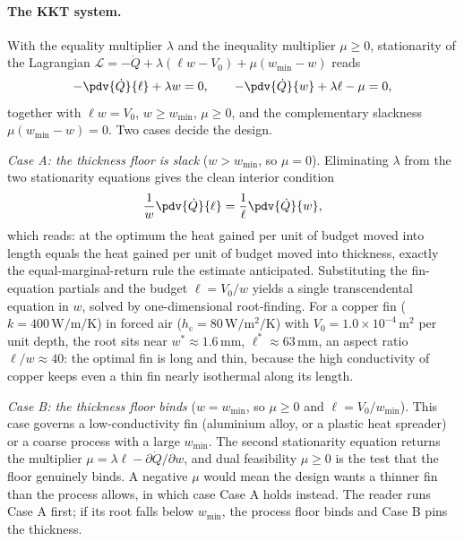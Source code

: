 \paragraph{The KKT system.} With the equality multiplier $\lambda$ and
the inequality multiplier $\mu \geq 0$, stationarity of the Lagrangian
$\mathcal{L} = -\dot{Q} + \lambda(\ell w - V_{0}) + \mu(w_{\min} - w)$
reads
\[
-\pdv{\dot{Q}}{\ell} + \lambda w = 0, \qquad
-\pdv{\dot{Q}}{w} + \lambda \ell - \mu = 0,
\]
together with $\ell w = V_{0}$, $w \geq w_{\min}$, $\mu \geq 0$, and the
complementary slackness $\mu(w_{\min} - w) = 0$. Two cases decide the
design.

\textit{Case A: the thickness floor is slack} ($w > w_{\min}$, so
$\mu = 0$). Eliminating $\lambda$ from the two stationarity equations
gives the clean interior condition
\[
\frac{1}{w}\pdv{\dot{Q}}{\ell} = \frac{1}{\ell}\pdv{\dot{Q}}{w},
\]
which reads: at the optimum the heat gained per unit of budget moved
into length equals the heat gained per unit of budget moved into
thickness, exactly the equal-marginal-return rule the estimate
anticipated. Substituting the fin-equation partials and the budget
$\ell = V_{0}/w$ yields a single transcendental equation in $w$, solved
by one-dimensional root-finding. For a copper fin
($k = 400\,\si{\watt\per\meter\per\kelvin}$) in forced air
($h_{\mathrm{c}} = 80\,\si{\watt\per\meter\squared\per\kelvin}$) with
$V_{0} = 1.0\times 10^{-4}\,\si{\meter\squared}$ per unit depth, the
root sits near $w^{*} \approx 1.6\,\si{\milli\meter}$,
$\ell^{*} \approx 63\,\si{\milli\meter}$, an aspect ratio
$\ell/w \approx 40$: the optimal fin is long and thin, because the high
conductivity of copper keeps even a thin fin nearly isothermal along its
length.

\textit{Case B: the thickness floor binds} ($w = w_{\min}$, so
$\mu \geq 0$ and $\ell = V_{0}/w_{\min}$). This case governs a
low-conductivity fin (aluminium alloy, or a plastic heat spreader) or a
coarse process with a large $w_{\min}$. The second stationarity equation
returns the multiplier
$\mu = \lambda\ell - \partial\dot{Q}/\partial w$, and dual feasibility
$\mu \geq 0$ is the test that the floor genuinely binds. A negative
$\mu$ would mean the design wants a thinner fin than the process allows,
in which case Case A holds instead. The reader runs Case A first; if its
root falls below $w_{\min}$, the process floor binds and Case B pins the
thickness.

